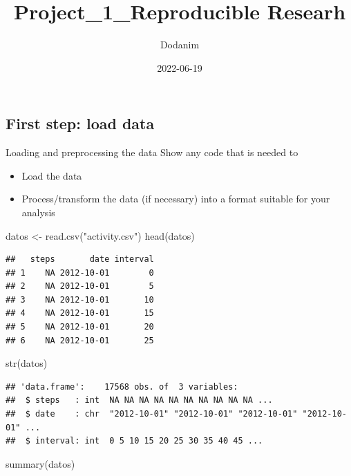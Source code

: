 \documentclass[
]{article}
\title{Project\_1\_Reproducible Researh}
\author{Dodanim}
\date{2022-06-19}
\newenvironment{Shaded}{\begin{snugshade}}{\end{snugshade}}
\newcommand{\FunctionTok}[1]{\textcolor[rgb]{0.00,0.00,0.00}{#1}}
\newcommand{\NormalTok}[1]{#1}
\newcommand{\OtherTok}[1]{\textcolor[rgb]{0.56,0.35,0.01}{#1}}
\newcommand{\StringTok}[1]{\textcolor[rgb]{0.31,0.60,0.02}{#1}}
\begin{document}
\maketitle

\hypertarget{first-step-load-data}{%
\subsection{First step: load data}\label{first-step-load-data}}

Loading and preprocessing the data Show any code that is needed to

\begin{itemize}
\item
  Load the data
\item
  Process/transform the data (if necessary) into a format suitable for
  your analysis
\end{itemize}

\begin{Shaded}
\begin{Highlighting}[]
\NormalTok{datos }\OtherTok{\textless{}{-}} \FunctionTok{read.csv}\NormalTok{(}\StringTok{"activity.csv"}\NormalTok{)}
\FunctionTok{head}\NormalTok{(datos)}
\end{Highlighting}
\end{Shaded}

\begin{verbatim}
##   steps       date interval
## 1    NA 2012-10-01        0
## 2    NA 2012-10-01        5
## 3    NA 2012-10-01       10
## 4    NA 2012-10-01       15
## 5    NA 2012-10-01       20
## 6    NA 2012-10-01       25
\end{verbatim}

\begin{Shaded}
\begin{Highlighting}[]
\FunctionTok{str}\NormalTok{(datos)}
\end{Highlighting}
\end{Shaded}

\begin{verbatim}
## 'data.frame':    17568 obs. of  3 variables:
##  $ steps   : int  NA NA NA NA NA NA NA NA NA NA ...
##  $ date    : chr  "2012-10-01" "2012-10-01" "2012-10-01" "2012-10-01" ...
##  $ interval: int  0 5 10 15 20 25 30 35 40 45 ...
\end{verbatim}

\begin{Shaded}
\begin{Highlighting}[]
\FunctionTok{summary}\NormalTok{(datos)}
\end{Highlighting}
\end{Shaded}
\end{document}
